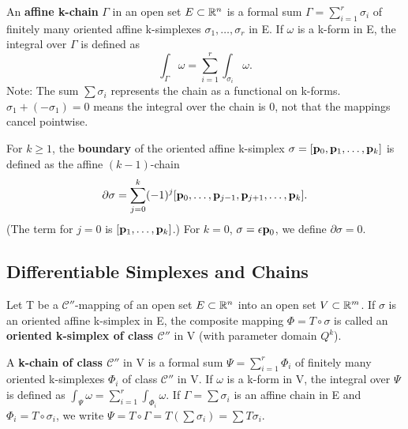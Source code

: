 \begin{definition}
  \label{def:chap10:affine_chain}
  An \textbf{affine k-chain} $\Gamma$ in an open set $E \subset \mathbb{R}^n$
  is a formal sum $\Gamma = \sum_{i=1}^r \sigma_i$ of finitely many
  oriented affine k-simplexes $\sigma_1, \dots, \sigma_r$ in E.
  If $\omega$ is a k-form in E, the integral over $\Gamma$ is defined as
  \[
    \int_\Gamma \omega = \sum_{i=1}^r \int_{\sigma_i} \omega.
  \]
  Note: The sum $\sum \sigma_i$ represents the chain as a functional
  on k-forms. $\sigma_1 + (-\sigma_1) = 0$ means the integral over
  the chain is 0, not that the mappings cancel pointwise.
\end{definition}

\begin{definition}
  \label{def:chap10:boundary_simplex}
  For $k \ge 1$, the \textbf{boundary} of the oriented affine
  k-simplex $\sigma = [\mathbf{p}_0, \mathbf{p}_1, \dots, \mathbf{p}_k]$ is
  defined as the affine $(k-1)$-chain
  \[
    \partial \sigma = \sum_{j=0}^k (-1)^j [\mathbf{p}_0, \dots,
    \mathbf{p}_{j-1}, \mathbf{p}_{j+1}, \dots, \mathbf{p}_k].
  \]
  (The term for $j=0$ is $[\mathbf{p}_1, \dots, \mathbf{p}_k]$.)
  For $k=0$, $\sigma = \epsilon \mathbf{p}_0$, we define $\partial \sigma = 0$.
\end{definition}



\subsection*{Differentiable Simplexes and Chains}
\label{sec:chap10:diff_simplex_chain}

Let T be a $\mathcal{C}''$-mapping of an open set $E \subset \mathbb{R}^n$
into an open set $V \subset \mathbb{R}^m$.
If $\sigma$ is an oriented affine k-simplex in E, the composite
mapping $\Phi = T \circ \sigma$ is called an \textbf{oriented
k-simplex of class $\mathcal{C}''$} in V (with parameter domain $Q^k$).

A \textbf{k-chain of class $\mathcal{C}''$} in V is a formal sum
$\Psi = \sum_{i=1}^r \Phi_i$ of finitely many oriented k-simplexes
$\Phi_i$ of class $\mathcal{C}''$ in V.
If $\omega$ is a k-form in V, the integral over $\Psi$ is defined as
$\int_\Psi \omega = \sum_{i=1}^r \int_{\Phi_i} \omega$.
If $\Gamma = \sum \sigma_i$ is an affine chain in E and $\Phi_i = T
\circ \sigma_i$, we write $\Psi = T \circ \Gamma = T(\sum \sigma_i) =
\sum T\sigma_i$.

